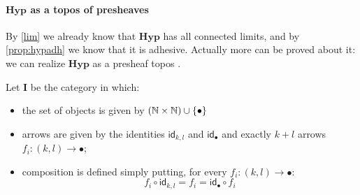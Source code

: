 \documentclass[runningheads,envcountsect]{lmcs}
\newcommand{\hyp}{\catname{Hyp}}
\newcommand{\catname}[1]{\mathbf{#1}}
\newcommand{\id}[1]{\mathsf{id}_{#1}}
\theoremstyle{plain}
\theoremstyle{definition}
\begin{document}
\paragraph{$\hyp$ as a topos of presheaves}
By \cref{lim} we already know that $\hyp$ has all connected limits, and by \cref{prop:hypadh} we know that it is adhesive. Actually more can be proved about it: we can realize $\hyp$ as a presheaf topos \cite{bonchi2022string}.

\begin{defi}Let $\catname{I}$ be the category in which:
	\begin{itemize}
		\item the set of objects is given by $\qty(\mathbb{N}\times \mathbb{N}) \cup \{\bullet\}$
		\item arrows are given by the identities $\id{k,l}$ and $\id{\bullet}$ and exactly $k+l$ arrows $f_i:(k,l)\rightarrow \bullet$;
		\item composition is defined simply putting, for every $f_i:(k,l)\rightarrow \bullet$:
		\begin{equation*}
		f_i\circ \id{k,l}=f_i = \id{\bullet}\circ f_i 
		\end{equation*}
	\end{itemize}
	
\end{defi}
\end{document}
